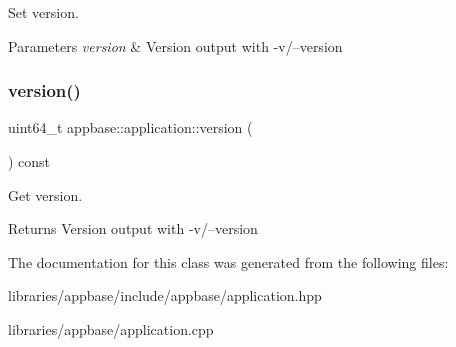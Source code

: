 Set version. 


\begin{DoxyParams}{Parameters}
{\em version} & Version output with -\/v/--version \\
\hline
\end{DoxyParams}
\mbox{\label{classappbase_1_1application_ae4ec67aea2aa3bab8800c875590245b2}} 
\subsubsection{\texorpdfstring{version()}{version()}}
{\footnotesize\ttfamily uint64\+\_\+t appbase\+::application\+::version (\begin{DoxyParamCaption}{ }\end{DoxyParamCaption}) const}



Get version. 

\begin{DoxyReturn}{Returns}
Version output with -\/v/--version 
\end{DoxyReturn}


The documentation for this class was generated from the following files\+:\begin{DoxyCompactItemize}
\item 
libraries/appbase/include/appbase/application.\+hpp\item 
libraries/appbase/application.\+cpp\end{DoxyCompactItemize}
